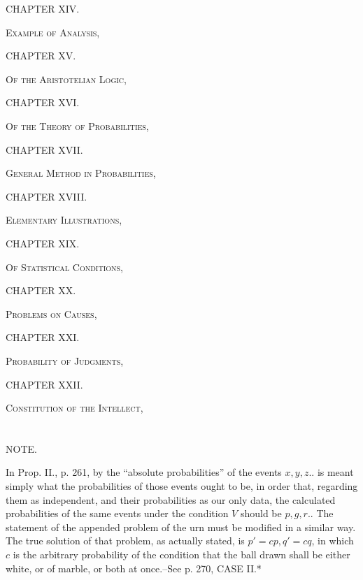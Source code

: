 \documentclass[oneside]{book}
\begin{document}
\large
\begin{center}
CHAPTER XIV.
\end{center}
\normalsize
\textsc{Example of Analysis,}

\large
\begin{center}
CHAPTER XV.
\end{center}
\normalsize
\textsc{Of the Aristotelian Logic,}

\large
\begin{center}
CHAPTER XVI.
\end{center}
\normalsize
\textsc{Of the Theory of Probabilities,}

\large
\begin{center}
CHAPTER XVII.
\end{center}
\normalsize
\textsc{General Method in Probabilities,}

\large
\begin{center}
CHAPTER XVIII.
\end{center}
\normalsize
\textsc{Elementary Illustrations,}

\large
\begin{center}
CHAPTER XIX.
\end{center}
\normalsize
\textsc{Of Statistical Conditions,}

\large
\begin{center}
CHAPTER XX.
\end{center}
\normalsize
\textsc{Problems on Causes,}

\large
\begin{center}
CHAPTER XXI.
\end{center}
\normalsize
\textsc{Probability of Judgments,}

\large
\begin{center}
CHAPTER XXII.
\end{center}
\normalsize
\textsc{Constitution of the Intellect,}


\chapter[]{}
\begin{center}
\Huge
NOTE.\normalsize \bigskip
\end{center}
In Prop. II., p. 261, by the ``absolute probabilities'' of the events $x, y, z ..$  is
meant simply what the probabilities of those events ought to be, in order that,
regarding them as independent, and their probabilities as our only data, the calculated probabilities of the same events under the condition $V$ should be $p, g, r ..$
The statement of the appended problem of the urn must be modified in a similar
way. The true solution of that problem, as actually stated, is $p' = cp, q' = cq$,
in which $c$ is the arbitrary probability of the condition that the ball drawn shall
be either white, or of marble, or both at once.--See p. 270, CASE II.*
\end{document}
